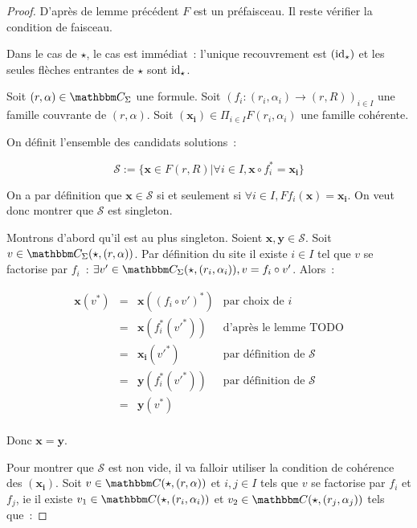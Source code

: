 \begin{proof}
    D'après de lemme précédent $F$ est un préfaisceau. Il reste vérifier la condition
    de faisceau.

    Dans le cas de $\star$, le cas est immédiat~: l'unique recouvrement est $(\operatorname{id}_\star)$
    et les seules flèches entrantes de $\star$ sont $\operatorname{id}_\star$.

    Soit $(r,\alpha)\in\C_\Sigma$ une formule. Soit $(f_i : (r_i,
    \alpha_i)\rightarrow (r,R))_{i\in I}$ une famille couvrante de
    $(r,\alpha)$.  Soit $(\mathbf{x_i})\in\Pi_{i\in I} F(r_i,\alpha_i)$ une
    famille cohérente.

    On définit l'ensemble des candidats solutions~:

    \[\mathscr{S} := \{ \mathbf{x}\in F(r,R)
                      | \forall i\in I, \mathbf{x}\circ f_i^* = \mathbf{x_i} \} \]

    On a par définition que $\mathbf{x}\in\mathscr{S}$ si et seulement si
    $\forall i\in I, Ff_i(\mathbf{x}) = \mathbf{x_i}$. On veut donc montrer que
    $\mathscr{S}$ est singleton.

    Montrons d'abord qu'il est au plus singleton. Soient $\mathbf{x},
    \mathbf{y}\in\mathscr{S}$. Soit $v\in\C_\Sigma(\star,(r,\alpha))$.
    Par définition du site il existe $i\in I$ tel que $v$ se factorise
    par $f_i$~: $\exists v'\in\C_\Sigma(\star,(r_i,\alpha_i)), v = f_i\circ v'$.
    Alors~:
    
    \[\begin{array}{rcll}
        \mathbf{x}(v^*) & = & \mathbf{x}((f_i\circ v')^*)
                                 & \text{par choix de } i \\
                        & = & \mathbf{x}(f_i^*(v'^*))
                                 & \text{d'après le lemme TODO} \\
                        & = & \mathbf{x_i}(v'^*)
                                 & \text{par définition de }\mathscr{S}\\
                        & = & \mathbf{y}(f_i^*(v'^*))
                                 & \text{par définition de }\mathscr{S}\\
                        & = & \mathbf{y}(v^*) & \\
    \end{array}\]

    Donc $\mathbf{x} = \mathbf{y}$.

    Pour montrer que $\mathscr{S}$ est non vide, il va falloir utiliser la condition de
    cohérence des $(\mathbf{x_i})$. Soit $v\in\C(\star, (r,\alpha))$ et $i,j\in I$ tels
    que $v$ se factorise par $f_i$ et $f_j$, ie
    il existe $v_1\in\C(\star, (r_i,\alpha_i))$ et $v_2\in\C(\star, (r_j,\alpha_j))$ tels
    que~:
    

\end{proof}
